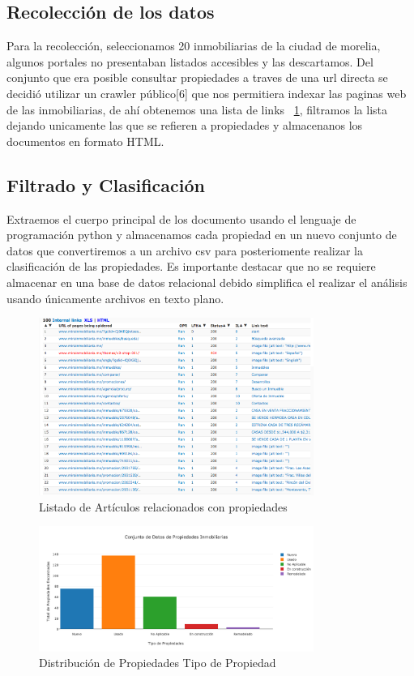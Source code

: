 \subsection{Recolección de los datos}

Para la recolección, seleccionamos 20 inmobiliarias de la ciudad de morelia, algunos portales no presentaban listados accesibles y las descartamos. Del conjunto que era posible consultar propiedades a traves de una url directa se decidió  utilizar un crawler público{[}6{]} que nos permitiera indexar las paginas web de las inmobiliarias, de ahí obtenemos una lista de links ~\ref{fig:CrawlerList}, filtramos la lista dejando unicamente las que se refieren a propiedades y almacenanos los documentos en formato HTML. 
\subsection{Filtrado y Clasificación}

Extraemos el cuerpo principal de los documento usando el lenguaje de programación python y almacenamos cada propiedad en un nuevo conjunto de datos  que convertiremos a un archivo csv para posteriomente  realizar la clasificación de las propiedades. Es importante destacar que no se requiere almacenar en una base de datos relacional debido simplifica  el realizar el análisis usando únicamente archivos en texto plano.


\begin{figure}[htbp]
\centering
\includegraphics[width=0.8\textwidth]{CrawlerSite.png}
\caption{Listado de Artículos relacionados con propiedades}
\label{fig:CrawlerList}
\end{figure}


\begin{figure}[htbp]
\centering
\includegraphics[width=0.8\textwidth]{PropiedadesInmobiliariasEstadoVivienda.png}
\caption{Distribución de Propiedades Tipo de Propiedad}
\label{fig:PropiedadesType}
\end{figure}

